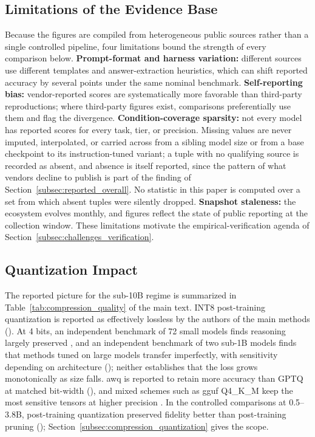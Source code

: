 \subsection{Limitations of the Evidence Base}
\label{subsec:reported_limits}
Because the figures are compiled from heterogeneous public sources rather than a
single controlled pipeline, four limitations bound the strength of every
comparison below. \textbf{Prompt-format and harness variation:} different sources
use different templates and answer-extraction heuristics, which can shift reported
accuracy by several points under the same nominal benchmark. \textbf{Self-reporting
bias:} vendor-reported scores are systematically more favorable than third-party
reproductions; where third-party figures exist, comparisons preferentially use
them and flag the divergence. \textbf{Condition-coverage sparsity:} not every
model has reported scores for every task, tier, or precision. Missing values are
never imputed, interpolated, or carried across from a sibling model size or from
a base checkpoint to its instruction-tuned variant; a tuple with no qualifying
source is recorded as absent, and absence is itself reported, since the pattern
of what vendors decline to publish is part of the finding of
Section~\ref{subsec:reported_overall}. No statistic in this paper is computed
over a set from which absent tuples were silently dropped. \textbf{Snapshot staleness:} the ecosystem evolves monthly,
and figures reflect the state of public reporting at the collection window. These
limitations motivate the empirical-verification agenda of
Section~\ref{subsec:challenges_verification}.

\subsection{Quantization Impact}
\label{subsec:reported_quantization}

The reported picture for the sub-10B regime is summarized in
Table~\ref{tab:compression_quality} of the main text. INT8 post-training
quantization is reported as effectively lossless by the authors of the main
methods \citep{dettmers2022llmint8,xiao2023smoothquant} (\evC). At 4 bits, an
independent benchmark of 72 small models finds reasoning largely preserved
\citep{srivastava2025thinkslm}, and an independent benchmark of two sub-1B models
finds that methods tuned on large models transfer imperfectly, with sensitivity
depending on architecture \citep{slmquant2025} (\evB); neither establishes that
the loss grows monotonically as size falls. \gls{awq} is reported to retain more
accuracy than GPTQ at matched bit-width \citep{lin2024awq} (\evC), and mixed
schemes such as \gls{gguf} Q4\_K\_M keep the most sensitive tensors at higher
precision \citep{gerganov2023llamacpp}. In the controlled comparisons at
0.5--3.8B, post-training quantization preserved fidelity better than
post-training pruning \citep{kurz2025pruning_vs_quant,srivastava2025thinkslm}
(\evA); Section~\ref{subsec:compression_quantization} gives the scope.

